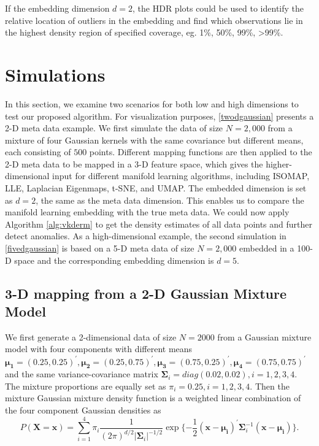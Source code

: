 \documentclass[11pt,a4paper,]{article}
\begin{document}
If the embedding dimension \(d=2\), the HDR plots \autocite{Hyndman1996-lk} could be used to identify the relative location of outliers in the embedding and find which observations lie in the highest density region of specified coverage, eg. 1\%, 50\%, 99\%, \textgreater99\%.

\hypertarget{simulation}{%
\section{Simulations}\label{simulation}}

In this section, we examine two scenarios for both low and high dimensions to test our proposed algorithm. For visualization purposes, \autoref{twodgaussian} presents a 2-D meta data example. We first simulate the data of size \(N=2,000\) from a mixture of four Gaussian kernels with the same covariance but different means, each consisting of \(500\) points. Different mapping functions are then applied to the 2-D meta data to be mapped in a 3-D feature space, which gives the higher-dimensional input for different manifold learning algorithms, including ISOMAP, LLE, Laplacian Eigenmaps, t-SNE, and UMAP. The embedded dimension is set as \(d=2\), the same as the meta data dimension.
This enables us to compare the manifold learning embedding with the true meta data. We could now apply Algorithm \ref{alg:vkderm} to get the density estimates of all data points and further detect anomalies. As a high-dimensional example, the second simulation in \autoref{fivedgaussian} is based on a 5-D meta data of size \(N=2,000\) embedded in a 100-D space and the corresponding embedding dimension is \(d=5\).

\hypertarget{twodgaussian}{%
\subsection{3-D mapping from a 2-D Gaussian Mixture Model}\label{twodgaussian}}

We first generate a 2-dimensional data of size \(N=2000\) from a Gaussian mixture model with four components with different means
\(\pmb{\mu_1}=(0.25, 0.25)^\prime, \pmb{\mu_2}=(0.25, 0.75)^\prime, \pmb{\mu_3}=(0.75, 0.25)^\prime, \pmb{\mu_4}=(0.75, 0.75)^\prime\) and the same variance-covariance matrix \(\pmb{\Sigma}_i=diag(0.02, 0.02), i=1,2,3,4\). The mixture proportions
are equally set as \(\pi_i=0.25, i=1,2,3,4\).
Then the mixture Gaussian mixture density function is a weighted linear combination of the four component Gaussian densities as
\begin{equation}
\label{eq:gmm}
P(\pmb{X}=\pmb{x}) = \sum_{i=1}^{4}\pi_i \frac{1}{(2\pi)^{d/2}|\pmb{\Sigma}_i|^{-1/2}} \exp{\{-\frac{1}{2} (\pmb{x}-\pmb{\mu_i})^\prime \pmb{\Sigma}_i^{-1} (\pmb{x}-\pmb{\mu_i}) \}}.
\end{equation}
\end{document}

